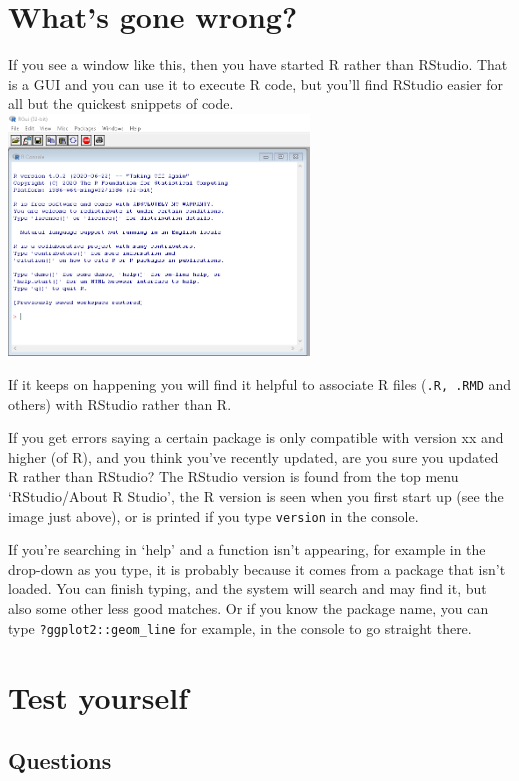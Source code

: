\documentclass[
]{book}
\begin{document}
\hypertarget{whats-gone-wrong-1}{%
\section{What's gone wrong?}\label{whats-gone-wrong-1}}

If you see a window like this, then you have started R rather than RStudio. That is a GUI and you can use it to execute R code, but you'll find RStudio easier for all but the quickest snippets of code. \includegraphics[width=0.6\textwidth,height=\textheight]{images/RGui.png}

If it keeps on happening you will find it helpful to associate R files (\texttt{.R,\ .RMD} and others) with RStudio rather than R.

If you get errors saying a certain package is only compatible with version xx and higher (of R), and you think you've recently updated, are you sure you updated R rather than RStudio? The RStudio version is found from the top menu `RStudio/About R Studio', the R version is seen when you first start up (see the image just above), or is printed if you type \texttt{version} in the console.

If you're searching in `help' and a function isn't appearing, for example in the drop-down as you type, it is probably because it comes from a package that isn't loaded. You can finish typing, and the system will search and may find it, but also some other less good matches. Or if you know the package name, you can type \texttt{?ggplot2::geom\_line} for example, in the console to go straight there.

\hypertarget{test-yourself}{%
\section{Test yourself}\label{test-yourself}}

\hypertarget{questions}{%
\subsection{Questions}\label{questions}}
\end{document}
